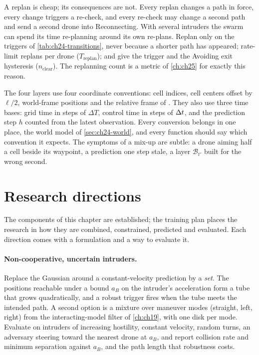 \begin{pitfall}
A replan is cheap; its consequences are not. Every replan changes a path in
force, every change triggers a re-check, and every re-check may change a
second path and send a second drone into Reconnecting. With several
intruders the swarm can spend its time re-planning around its own re-plans. Replan
only on the triggers of \cref{tab:ch24-transitions}, never because a
shorter path has appeared; rate-limit replans per drone
($T_{\mathrm{replan}}$); and give the trigger and the Avoiding exit
hysteresis ($n_{\mathrm{clear}}$). The replanning count is a metric of
\cref{ch:ch25} for exactly this reason.
\end{pitfall}

\begin{pitfall}
The four layers use four coordinate conventions: cell indices, cell centers
offset by $\ell/2$, world-frame positions and the relative frame of \orca.
They also use three time bases: grid time in steps of $\Delta T$, control
time in steps of $\Delta t$, and the prediction step $h$ counted from the latest
observation. Every
conversion belongs in one place, the world model of \cref{sec:ch24-world},
and every function should say which convention it expects. The symptoms of
a mix-up are subtle: a drone aiming half a cell beside its waypoint, a
prediction one step stale, a layer $\mathcal{B}_{t'}$ built for the wrong second.
\end{pitfall}

\section{Research directions}
\label{sec:ch24-research}

The components of this chapter are established; the training plan places
the research in how they are combined, constrained, predicted and
evaluated. Each direction comes with a formulation and a way to evaluate it.

\paragraph{Non-cooperative, uncertain intruders.}
Replace the Gaussian around a constant-velocity prediction by a
\emph{set}. The positions reachable under a bound $a_B$ on the intruder's
acceleration form a tube that grows quadratically, and a robust trigger
fires when the tube meets the intended path. A second option is a mixture
over maneuver modes (straight, left, right) from the interacting-model
filter of \cref{ch:ch19}, with one disk per mode. Evaluate on intruders of increasing
hostility, constant velocity, random turns, an adversary steering toward
the nearest drone at $a_B$, and report collision rate and minimum
separation against $a_B$, and the path length that robustness costs.

